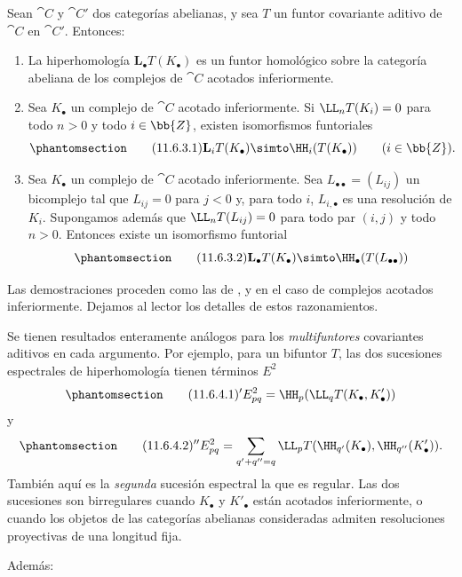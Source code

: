 \documentclass[oneside]{amsart}
\newcommand{\oldpage}[2][]{{\marginnote{\normalfont\textbf{#1}~|~#2}}\ignorespaces}
\let\EGAOriginalLabel\label
\renewcommand{\label}[1]{\phantomsection\EGAOriginalLabel{#1}}
\begin{document}
\begin{proposition}[11.6.3]
\label{0.11.6.3}
Sean $\cat{C}$ y $\cat{C}'$ dos categorías abelianas, y sea $T$ un funtor covariante aditivo de $\cat{C}$ en $\cat{C}'$.
Entonces:
\begin{enumerate}
  \item[{\rm(i)}] {La hiperhomología $\mathbf{L}_\bullet T(K_\bullet)$ es un funtor homológico sobre la categoría abeliana de los complejos de $\cat{C}$ acotados inferiormente.}

  \item[{\rm(ii)}] {Sea $K_\bullet$ un complejo de $\cat{C}$ acotado inferiormente.
  Si $\LL_nT(K_i)=0$ para todo $n>0$ y todo $i\in\bb{Z}$, existen isomorfismos funtoriales}
  \[
  \label{0.11.6.3.1}
  \tag{11.6.3.1}
    \mathbf{L}_iT(K_\bullet)
    \simto
    \HH_i(T(K_\bullet))
    \qquad(i\in\bb{Z}).
  \]

  \item[{\rm(iii)}] {Sea $K_\bullet$ un complejo de $\cat{C}$ acotado inferiormente.
  Sea $L_{\bullet\bullet}=(L_{ij})$ un bicomplejo tal que $L_{ij}=0$ para $j<0$ y, para todo $i$, $L_{i,\bullet}$ es una resolución de $K_i$.
  Supongamos además que $\LL_nT(L_{ij})=0$ para todo par $(i,j)$ y todo $n>0$.
  Entonces existe un isomorfismo funtorial}
  \[
  \label{0.11.6.3.2}
  \tag{11.6.3.2}
    \mathbf{L}_\bullet T(K_\bullet)
    \simto
    \HH_\bullet(T(L_{\bullet\bullet}))
  \]
\end{enumerate}

\upshape Las demostraciones proceden como las de ,  y  en el caso de complejos acotados inferiormente.
Dejamos al lector los detalles de estos razonamientos.
\end{proposition}

\begin{env}[11.6.4]
\label{0.11.6.4}
Se tienen resultados enteramente análogos para los \emph{multifuntores} covariantes aditivos en cada argumento.
Por ejemplo, para un bifuntor $T$, las dos sucesiones espectrales de hiperhomología tienen términos $E^2$
\oldpage[0\textsubscript{III}]{41}
\[
\label{0.11.6.4.1}
\tag{11.6.4.1}
  {}'E^2_{pq}
  =\HH_p(\LL_qT(K_\bullet,K'_\bullet))
\]
y
\[
\label{0.11.6.4.2}
\tag{11.6.4.2}
  {}''E^2_{pq}
  =
  \sum_{q'+q''=q}
  \LL_pT(\HH_{q'}(K_\bullet),\HH_{q''}(K'_\bullet)).
\]
También aquí es la \emph{segunda} sucesión espectral la que es regular.
Las dos sucesiones son birregulares cuando $K_\bullet$ y $K'_\bullet$ están acotados inferiormente, o cuando los objetos de las categorías abelianas consideradas admiten resoluciones proyectivas de una longitud fija.

Además:
\end{env}
\end{document}
